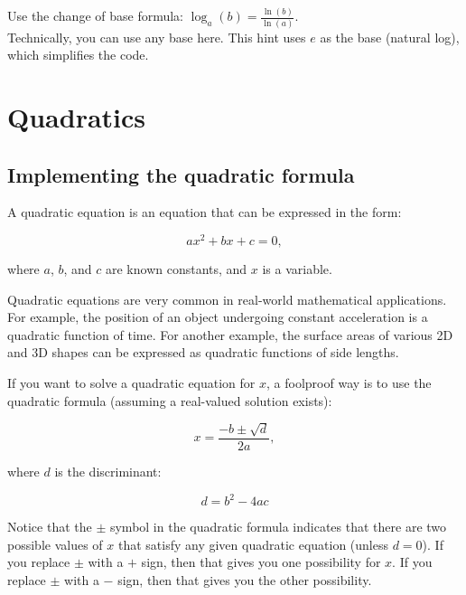 \documentclass{article}
\newenvironment{hint}
    {\begin{tcolorbox}[title=Hint,colframe=white!70!blue,colback=white]}
    {\end{tcolorbox}}
\begin{document}
\begin{hint}
    Use the change of base formula: $\log_a(b) = \frac{\ln (b)}{\ln (a)}$.\\

    Technically, you can use any base here. This hint uses $e$ as the base (natural log), which simplifies the code.
\end{hint}

\clearpage

\section{Quadratics}

\subsection{Implementing the quadratic formula}

A quadratic equation is an equation that can be expressed in the form:

\begin{equation}
    ax^2 + bx + c = 0,
\end{equation}

where $a$, $b$, and $c$ are known constants, and $x$ is a variable.

Quadratic equations are very common in real-world mathematical applications. For example, the position of an object undergoing constant acceleration is a quadratic function of time. For another example, the surface areas of various 2D and 3D shapes can be expressed as quadratic functions of side lengths.

If you want to solve a quadratic equation for $x$, a foolproof way is to use the quadratic formula (assuming a real-valued solution exists):

\begin{equation}
    x = \frac{-b \pm \sqrt{d}}{2a},
\end{equation}

where $d$ is the discriminant:

\begin{equation}
    d = b^2 - 4ac
\end{equation}

Notice that the $\pm$ symbol in the quadratic formula indicates that there are two possible values of $x$ that satisfy any given quadratic equation (unless $d=0$). If you replace $\pm$ with a $+$ sign, then that gives you one possibility for $x$. If you replace $\pm$ with a $-$ sign, then that gives you the other possibility.
\end{document}

